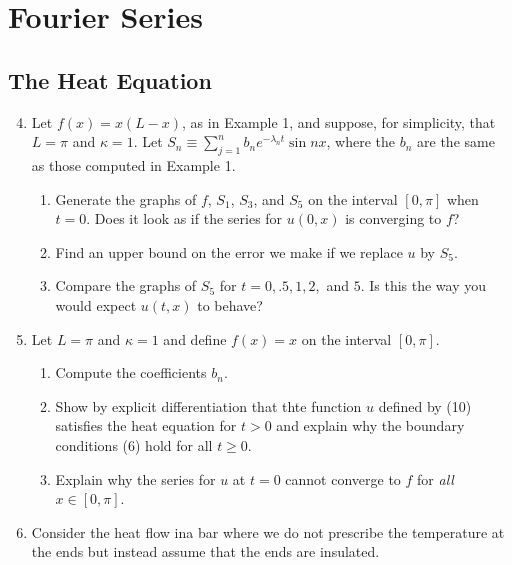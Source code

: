 \documentclass{article}
\begin{document}
\setcounter{section}{8}
\section{Fourier Series}

\subsection{The Heat Equation}

\begin{enumerate}
    \setcounter{enumi}{3}
    \item Let $f(x)=x(L-x)$, as in Example 1, and suppose, for simplicity, that
          $L=\pi$ and $\kappa=1$. Let $S_n\equiv \sum_{j=1}^nb_ne^{-\lambda_nt}\sin nx$,
          where the $b_n$ are the same as those computed in Example 1.
          \begin{enumerate}
              \item Generate the graphs of $f$, $S_1$, $S_3$, and $S_5$ on the interval
                    $[0,\pi]$ when $t=0$. Does it look as if the series for $u(0,x)$ is
                    converging to $f$?
              \item Find an upper bound on the error we make if we replace $u$ by $S_5$.
              \item Compare the graphs of $S_5$ for $t=0,.5,1,2,$ and $5$. Is this the
                    way you would expect $u(t,x)$ to behave?
          \end{enumerate}
    \item Let $L=\pi$ and $\kappa=1$ and define $f(x)=x$ on the interval $[0,\pi]$.
          \begin{enumerate}
              \item Compute the coefficients $b_n$.
              \item Show by explicit differentiation that thte function $u$ defined by
                    (10) satisfies the heat equation for $t>0$ and explain why the
                    boundary conditions (6) hold for all $t\geq 0$.
              \item Explain why the series for $u$ at $t=0$ cannot converge to $f$ for
                    \textit{all} $x\in [0,\pi]$.
          \end{enumerate}
          \setcounter{enumi}{6}
    \item Consider the heat flow ina  bar where we do not prescribe the temperature
          at the ends but instead assume that the ends are insulated.
          \begin{enumerate}

\end{enumerate}
\end{enumerate}
\end{document}
